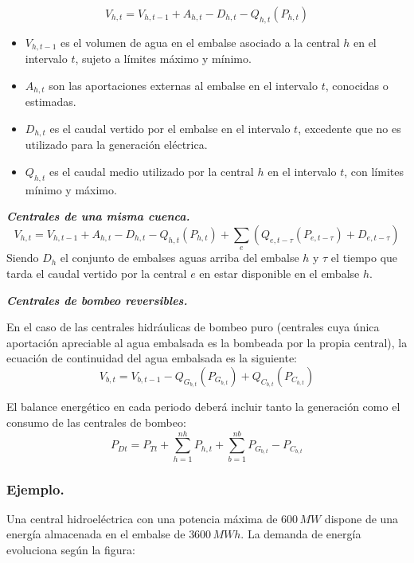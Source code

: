 				\[V_{h,t} = V_{h,t-1} + A_{h,t} - D_{h,t} - Q_{h,t}(P_{h,t})\]
				\begin{itemize}
					\item $V_{h,t-1}$ es el volumen de agua en el embalse asociado a la central $h$ en el intervalo $t$, sujeto a límites máximo y mínimo.
					\item $A_{h,t}$ son las aportaciones externas al embalse en el intervalo $t$, conocidas o estimadas.
					\item $D_{h,t}$ es el caudal vertido por el embalse en el intervalo $t$, excedente que no es utilizado para la generación eléctrica.
					\item $Q_{h,t}$ es el caudal medio utilizado por la central $h$ en el intervalo $t$, con límites mínimo y máximo.
				\end{itemize}
				
				\textbf{\textit{Centrales de una misma cuenca.}}
				\[V_{h,t} = V_{h,t-1} + A_{h,t} - D_{h,t} - Q_{h,t}(P_{h,t}) + \sum_e \left(Q_{e,t-\tau}(P_{e,t-\tau}) + D_{e,t-\tau}\right)\]
				Siendo $D_h$ el conjunto de embalses aguas arriba del embalse $h$ y $\tau$ el tiempo que tarda el caudal vertido por la central $e$ en estar disponible en el embalse $h$.
				
				\newpage
				\textbf{\textit{Centrales de bombeo reversibles.}}
				
				
				En el caso de las centrales hidráulicas de bombeo puro (centrales cuya única aportación apreciable al agua
				embalsada es la bombeada por la propia central), la ecuación de continuidad del agua embalsada es la
				siguiente:
				\[V_{b,t} = V_{b,t-1} - Q_{G_{b,t}}(P_{G_{b,t}}) + Q_{C_{b,t}}(P_{C_{b,t}})\]
				
				El balance energético en cada periodo deberá incluir tanto la generación como el consumo de las centrales de
				bombeo:
				\[P_{Dt} = P_{Tt} + \sum_{h=1}^{nh}P_{h,t} + \sum_{b=1}^{nb}P_{G_{b,t}}-P_{C_{b,t}}\]
				
			\subsubsection*{Ejemplo.}
				Una central hidroeléctrica con una potencia máxima de $600\,MW$ dispone de una energía almacenada en el embalse de $3600\,MWh$. La demanda de energía evoluciona según la figura:
				
